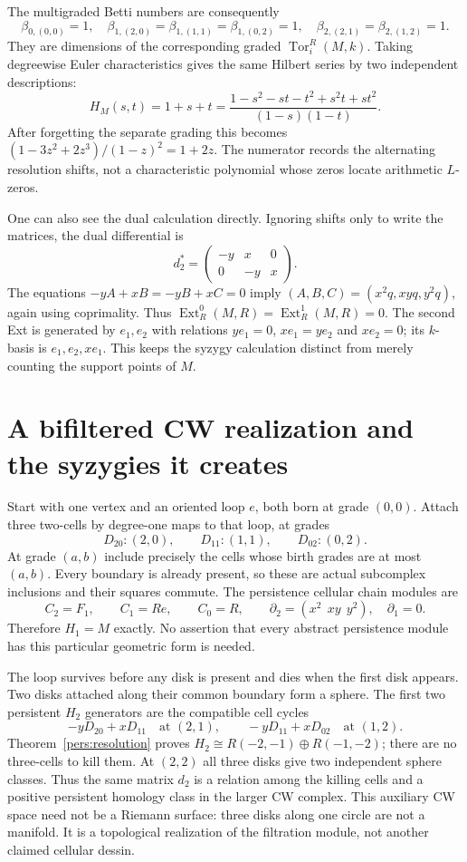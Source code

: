 \documentclass[11pt,oneside,openany]{book}
\theoremstyle{definition}\newtheorem{definition}[theorem]{Definition}
\theoremstyle{remark}\newtheorem{remark}[theorem]{Remark}
\begin{document}
The multigraded Betti numbers are consequently
\[
 \beta_{0,(0,0)}=1,\quad
 \beta_{1,(2,0)}=\beta_{1,(1,1)}=\beta_{1,(0,2)}=1,\quad
 \beta_{2,(2,1)}=\beta_{2,(1,2)}=1.
\]
They are dimensions of the corresponding graded $\operatorname{Tor}^R_i(M,k)$.
Taking degreewise Euler characteristics gives the same Hilbert series by
two independent descriptions:
\[
 H_M(s,t)=1+s+t
 =\frac{1-s^2-st-t^2+s^2t+st^2}{(1-s)(1-t)}.
\]
After forgetting the separate grading this becomes
$(1-3z^2+2z^3)/(1-z)^2=1+2z$. The numerator records the alternating
resolution shifts, not a characteristic polynomial whose zeros locate
arithmetic $L$-zeros.

One can also see the dual calculation directly. Ignoring shifts only to
write the matrices, the dual differential is
\[
 d_2^*=\begin{pmatrix}-y&x&0\\0&-y&x\end{pmatrix}.
\]
The equations $-yA+xB=-yB+xC=0$ imply
$(A,B,C)=(x^2q,xyq,y^2q)$, again using coprimality. Thus
$\operatorname{Ext}^0_R(M,R)=\operatorname{Ext}^1_R(M,R)=0$.
The second Ext is generated by $e_1,e_2$ with relations
$ye_1=0$, $xe_1=ye_2$ and $xe_2=0$; its $k$-basis is
$e_1,e_2,xe_1$. This keeps the syzygy calculation distinct from merely
counting the support points of $M$.

\section{A bifiltered CW realization and the syzygies it creates}
Start with one vertex and an oriented loop $e$, both born at grade $(0,0)$.
Attach three two-cells by degree-one maps to that loop, at grades
\[
 D_{20}:(2,0),\qquad D_{11}:(1,1),\qquad D_{02}:(0,2).
\]
At grade $(a,b)$ include precisely the cells whose birth grades are at
most $(a,b)$. Every boundary is already present, so these are actual
subcomplex inclusions and their squares commute. The persistence cellular
chain modules are
\[
 C_2=F_1,\qquad C_1=R e,\qquad C_0=R,\qquad
 \partial_2=(x^2\ \ xy\ \ y^2),\quad\partial_1=0.
\]
Therefore $H_1=M$ exactly. No assertion that every abstract persistence
module has this particular geometric form is needed.

The loop survives before any disk is present and dies when the first disk
appears. Two disks attached along their common boundary form a sphere.
The first two persistent $H_2$ generators are the compatible cell cycles
\[
 -yD_{20}+xD_{11}\quad\text{at }(2,1),\qquad
 -yD_{11}+xD_{02}\quad\text{at }(1,2).
\]
Theorem~\ref{pers:resolution} proves
$H_2\cong R(-2,-1)\oplus R(-1,-2)$; there are no three-cells to kill
them. At $(2,2)$ all three disks give two independent sphere classes.
Thus the same matrix $d_2$ is a relation among the killing cells and a
positive persistent homology class in the larger CW complex.
This auxiliary CW space need not be a Riemann surface: three disks along
one circle are not a manifold. It is a topological realization of the
filtration module, not another claimed cellular dessin.
\end{document}
